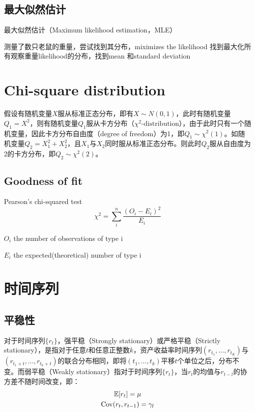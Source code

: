 \documentclass[11pt]{article}
\begin{document}
\subsection{最大似然估计}
    
最大似然估计（Maximum likelihood estimation，MLE）

测量了数只老鼠的重量，尝试找到其分布，miximizes the likelihood 找到最大化所有观察重量likelihood的分布，找到mean 和standard deviation

\section{Chi-square distribution}

假设有随机变量$X$服从标准正态分布，即有$X \sim N(0,1)$，此时有随机变量$Q_1=X^2$，则有随机变量$Q_1$服从卡方分布（$\chi^2\text{-distribution}$），由于此时只有一个随机变量，因此卡方分布自由度（degree of freedom）为1，即$Q_1 \sim \chi^2(1)$。如随机变量$Q_2 = X_1^2 + X_2^2$，且$X_1$与$X_2$同时服从标准正态分布。则此时$Q_2$服从自由度为2的卡方分布，即$Q_2 \sim \chi^2(2)$。

\subsection*{Goodness of fit}

Pearson's chi-squared test
\begin{equation*}
    \chi^2 = \sum_i^n \frac{(O_i - E_i)^2}{E_i}
\end{equation*}

\begin{list}{-}{}
    \item $O_i$ the number of observations of type i
    \item $E_i$ the expected(theoretical) number of type i
\end{list}

\section{时间序列}

\subsection{平稳性}

对于时间序列$\{r_t\}$，强平稳（Strongly stationary）或严格平稳（Strictly stationary），是指对于任意$t$和任意正整数$k$，资产收益率时间序列$(r_{t_1},\dots,r_{t_K})$与$(r_{t_1+t},\dots,r_{t_k+t})$的联合分布相同，即将$(t_1,\dots,t_k)$平移$t$个单位之后，分布不变。而弱平稳（Weakly stationary）指对于时间序列$\{r_t\}$，当$r_t$的均值与$r_{t-l}$的协方差不随时间改变，即：
\begin{gather*}
    \mathbb{E} [r_t] = \mu \\
    \operatorname{Cov} (r_t, r_{t-1}) = \gamma_l
\end{gather*}
\end{document}
